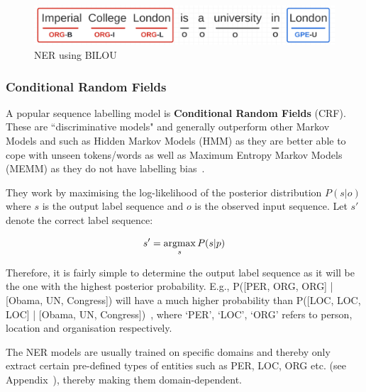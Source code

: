 \begin{figure}[H]
    \centering
    \includegraphics[scale=0.35]{images/bilou.png}
    \caption{NER using BILOU}
    \label{fig:bilou}
    \end{figure}

\subsubsection*{Conditional Random Fields}
A popular sequence labelling model is \textbf{Conditional Random Fields }(CRF). These are ``discriminative models" and generally outperform other Markov Models and such as Hidden Markov Models (HMM) as they are better able to cope with unseen tokens/words as well as Maximum Entropy Markov Models (MEMM) as they do not have labelling bias~\cite{crf}.

They work by maximising the log-likelihood of the posterior distribution $P(s|o)$ where $s$ is the output label sequence and $o$ is the observed input sequence. Let $s'$ denote the correct label sequence: 

\[ s' = \operatorname*{argmax}_{s} P (s|p) \]

Therefore, it is fairly simple to determine the output label sequence as it will be the one with the highest posterior probability. E.g., P([PER, ORG, ORG] | [Obama, UN, Congress]) will have a much higher probability than  P([LOC, LOC, LOC] | [Obama, UN, Congress])~\cite{crf}, where `PER', `LOC', `ORG' refers to person, location and organisation respectively.

The NER models are usually trained on specific domains and thereby only extract certain pre-defined types of entities such as PER, LOC, ORG etc. (see Appendix~), thereby making them domain-dependent.



